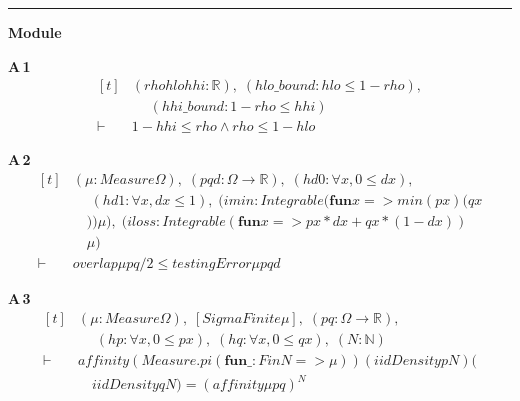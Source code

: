 \vspace{4pt}\noindent\rule{\columnwidth}{0.4pt}\par\vspace{2pt}
\noindent\textbf{Module }\par\vspace{3pt}

\noindent\textbf{A\,1}\quad{}
{\footnotesize\[ \begin{aligned}[t]
&(\mathit{rho} \mathit{hlo} \mathit{hhi} : \mathbb{R} ),\; (\mathit{hlo\_bound} : \mathit{hlo} \leq 1-\mathit{rho}),\\
&\quad \; (\mathit{hhi\_bound} : 1-\mathit{rho} \leq \mathit{hhi})\\
\vdash\;&1-\mathit{hhi} \leq \mathit{rho} \wedge \mathit{rho} \leq 1-\mathit{hlo}
\end{aligned} \]}

\noindent\textbf{A\,2}\quad{}
{\footnotesize\[ \begin{aligned}[t]
&(\mu : \mathit{Measure} \Omega ),\; (\mathit{p} \mathit{q} \mathit{d} : \Omega \to \mathbb{R} ),\; (\mathit{hd0} : \forall \mathit{x}, 0 \leq \mathit{d} \mathit{x}),\\
&\quad \; (\mathit{hd1} : \forall \mathit{x}, \mathit{d} \mathit{x} \leq 1),\; (\mathit{imin} : \mathit{Integrable} (\mathbf{fun} \mathit{x} => \mathit{min} (\mathit{p} \mathit{x}) (\mathit{q} \mathit{x}\\
&\quad )) \mu ),\; (\mathit{iloss} : \mathit{Integrable} (\mathbf{fun} \mathit{x} => \mathit{p} \mathit{x}*\mathit{d} \mathit{x}+\mathit{q} \mathit{x}*(1-\mathit{d} \mathit{x}))\\
&\quad \mu )\\
\vdash\;&\mathit{overlap} \mu \mathit{p} \mathit{q}/2 \leq \mathit{testingError} \mu \mathit{p} \mathit{q} \mathit{d}
\end{aligned} \]}

\noindent\textbf{A\,3}\quad{}
{\footnotesize\[ \begin{aligned}[t]
&(\mu : \mathit{Measure} \Omega ),\; [\mathit{SigmaFinite} \mu ],\; (\mathit{p} \mathit{q} : \Omega \to \mathbb{R} ),\\
&\quad \; (\mathit{hp} : \forall \mathit{x}, 0 \leq \mathit{p} \mathit{x}),\; (\mathit{hq} : \forall \mathit{x}, 0 \leq \mathit{q} \mathit{x}),\; (\mathit{N} : \mathbb{N} )\\
\vdash\;&\mathit{affinity} (\mathit{Measure}.\mathit{pi} (\mathbf{fun} \mathit{\_} : \mathit{Fin} \mathit{N} => \mu )) (\mathit{iidDensity} \mathit{p} \mathit{N}) (\\
&\quad \mathit{iidDensity} \mathit{q} \mathit{N}) = (\mathit{affinity} \mu \mathit{p} \mathit{q})^{\mathit{N}}
\end{aligned} \]}

